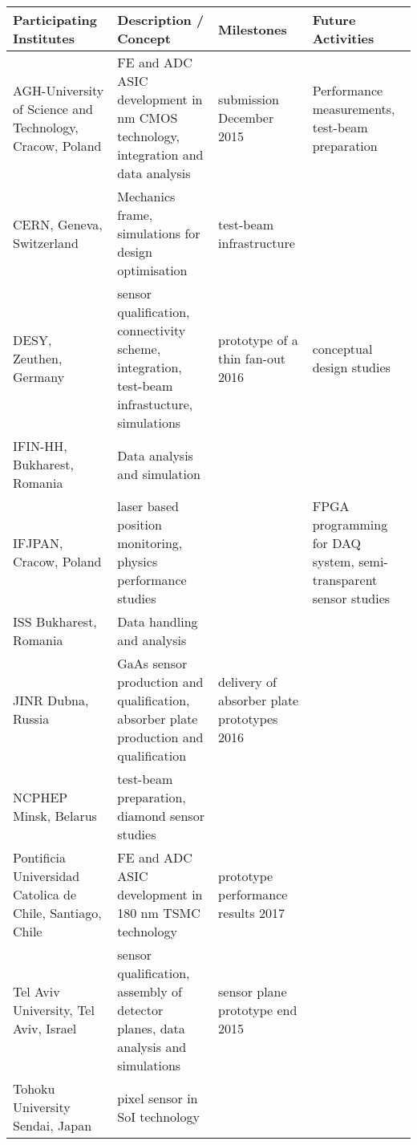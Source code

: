 \thispagestyle{empty}
\begin{landscape}
    \centering
    \begin{adjustbox}{max width=1.1\textwidth,totalheight=1\textheight}
\begin{tabularx}{1.1\textheight}{XXXX}
    \toprule
    Participating Institutes & Description / Concept & Milestones & Future Activities \\
    \midrule
     AGH-University of Science and Technology, Cracow, Poland &
     FE and ADC ASIC development in \unit[130]{nm} CMOS technology, integration and data analysis &
     submission December 2015 &
     Performance measurements, test-beam preparation \\
     \midrule
     CERN, Geneva, Switzerland &
     Mechanics frame, simulations for design optimisation &
     test-beam infrastructure \\
     \midrule
     DESY, Zeuthen, Germany &
     sensor qualification, connectivity scheme, integration, test-beam infrastucture, simulations &
     prototype of a thin fan-out 2016 &
     conceptual design studies\\
     \midrule
     IFIN-HH, Bukharest, Romania &
     Data analysis and simulation & & \\
     \midrule
     IFJPAN, Cracow, Poland &
     laser based position monitoring, physics performance studies &
     &
     FPGA programming for DAQ system, semi-transparent sensor studies \\
     \midrule
     ISS Bukharest, Romania &
     Data handling and analysis & & \\
     \midrule
     JINR Dubna, Russia &
     GaAs sensor production and qualification, absorber plate production and qualification &
     delivery of absorber plate prototypes 2016 & \\
     \midrule
     NCPHEP Minsk, Belarus &
     test-beam preparation, diamond sensor studies & & \\
     \midrule
     Pontificia Universidad Catolica de Chile, Santiago, Chile &
     FE and ADC ASIC development in 180 nm TSMC technology &
     prototype performance results 2017 & \\
     \midrule
     Tel Aviv University, Tel Aviv, Israel &
     sensor qualification, assembly of detector planes, data analysis and simulations &
     sensor plane prototype end 2015 & \\
     \midrule
     Tohoku University Sendai, Japan &
     pixel sensor in SoI technology &

\end{tabularx}
\end{adjustbox}
\end{landscape}
